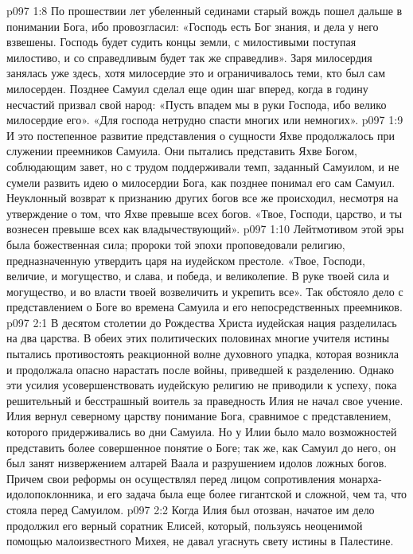 \vs p097 1:8 По прошествии лет убеленный сединами старый вождь пошел дальше в понимании Бога, ибо провозгласил: «Господь есть Бог знания, и дела у него взвешены. Господь будет судить концы земли, с милостивыми поступая милостиво, и со справедливым будет так же справедлив». Заря милосердия занялась уже здесь, хотя милосердие это и ограничивалось теми, кто был сам милосерден. Позднее Самуил сделал еще один шаг вперед, когда в годину несчастий призвал свой народ: «Пусть впадем мы в руки Господа, ибо велико милосердие его». «Для господа нетрудно спасти многих или немногих».
\vs p097 1:9 \pc И это постепенное развитие представления о сущности Яхве продолжалось при служении преемников Самуила. Они пытались представить Яхве Богом, соблюдающим завет, но с трудом поддерживали темп, заданный Самуилом, и не сумели развить идею о милосердии Бога, как позднее понимал его сам Самуил. Неуклонный возврат к признанию других богов все же происходил, несмотря на утверждение о том, что Яхве превыше всех богов. «Твое, Господи, царство, и ты вознесен превыше всех как владычествующий».
\vs p097 1:10 Лейтмотивом этой эры была божественная сила; пророки той эпохи проповедовали религию, предназначенную утвердить царя на иудейском престоле. «Твое, Господи, величие, и могущество, и слава, и победа, и великолепие. В руке твоей сила и могущество, и во власти твоей возвеличить и укрепить все». Так обстояло дело с представлением о Боге во времена Самуила и его непосредственных преемников.
\vs p097 2:1 В десятом столетии до Рождества Христа иудейская нация разделилась на два царства. В обеих этих политических половинах многие учителя истины пытались противостоять реакционной волне духовного упадка, которая возникла и продолжала опасно нарастать после войны, приведшей к разделению. Однако эти усилия усовершенствовать иудейскую религию не приводили к успеху, пока решительный и бесстрашный воитель за праведность Илия не начал свое учение. Илия вернул северному царству понимание Бога, сравнимое с представлением, которого придерживались во дни Самуила. Но у Илии было мало возможностей представить более совершенное понятие о Боге; так же, как Самуил до него, он был занят низвержением алтарей Ваала и разрушением идолов ложных богов. Причем свои реформы он осуществлял перед лицом сопротивления монарха\hyp{}идолопоклонника, и его задача была еще более гигантской и сложной, чем та, что стояла перед Самуилом.
\vs p097 2:2 Когда Илия был отозван, начатое им дело продолжил его верный соратник Елисей, который, пользуясь неоценимой помощью малоизвестного Михея, не давал угаснуть свету истины в Палестине.
